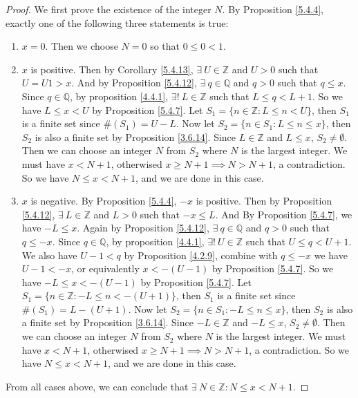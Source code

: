 \begin{proof}
We first prove the existence of the integer \(N\).
By Proposition \ref{5.4.4}, exactly one of the following three statements is true:
\begin{enumerate}
    \item \(x = 0\).
    Then we choose \(N = 0\) so that \(0 \leq 0 < 1\).
    \item \(x\) is positive.
    Then by Corollary \ref{5.4.13}, \(\exists\ U \in \mathds{Z}\) and \(U > 0\) such that \(U = U1 > x\).
    And by Proposition \ref{5.4.12}, \(\exists\ q \in \mathds{Q}\) and \(q > 0\) such that \(q \leq x\).
    Since \(q \in \mathds{Q}\), by proposition \ref{4.4.1}, \(\exists!\ L \in \mathds{Z}\) such that \(L \leq q < L + 1\).
    So we have \(L \leq x < U\) by Proposition \ref{5.4.7}.
    Let \(S_1 = \{n \in \mathds{Z} : L \leq n < U\}\), then \(S_1\) is a finite set since \(\#(S_1) = U - L\).
    Now let \(S_2 = \{n \in S_1 : L \leq n \leq x\}\), then \(S_2\) is also a finite set by Proposition \ref{3.6.14}.
    Since \(L \in \mathds{Z}\) and \(L \leq x\), \(S_2 \neq \emptyset\).
    Then we can choose an integer \(N\) from \(S_2\) where \(N\) is the largest integer.
    We must have \(x < N + 1\), otherwised \(x \geq N + 1 \implies N > N + 1\), a contradiction.
    So we have \(N \leq x < N + 1\), and we are done in this case.
    \item \(x\) is negative.
    By Proposition \ref{5.4.4}, \(-x\) is positive.
    Then by Proposition \ref{5.4.12}, \(\exists\ L \in \mathds{Z}\) and \(L > 0\) such that \(-x \leq L\).
    And By Proposition \ref{5.4.7}, we have \(-L \leq x\).
    Again by Proposition \ref{5.4.12}, \(\exists\ q \in \mathds{Q}\) and \(q > 0\) such that \(q \leq -x\).
    Since \(q \in \mathds{Q}\), by proposition \ref{4.4.1}, \(\exists!\ U \in \mathds{Z}\) such that \(U \leq q < U + 1\).
    We also have \(U - 1 < q\) by Proposition \ref{4.2.9}, combine with \(q \leq -x\) we have \(U - 1 < -x\), or equivalently \(x < -(U - 1)\) by Proposition \ref{5.4.7}.
    So we have \(-L \leq x < -(U - 1)\) by Proposition \ref{5.4.7}.
    Let \(S_1 = \{n \in \mathds{Z} : -L \leq n < -(U + 1)\}\), then \(S_1\) is a finite set since \(\#(S_1) = L - (U + 1)\).
    Now let \(S_2 = \{n \in S_1 : -L \leq n \leq x\}\), then \(S_2\) is also a finite set by Proposition \ref{3.6.14}.
    Since \(-L \in \mathds{Z}\) and \(-L \leq x\), \(S_2 \neq \emptyset\).
    Then we can choose an integer \(N\) from \(S_2\) where \(N\) is the largest integer.
    We must have \(x < N + 1\), otherwised \(x \geq N + 1 \implies N > N + 1\), a contradiction.
    So we have \(N \leq x < N + 1\), and we are done in this case.
\end{enumerate}
From all cases above, we can conclude that \(\exists\ N \in \mathds{Z} : N \leq x < N + 1\).


\end{proof}
